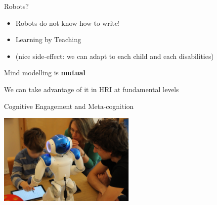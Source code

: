 \documentclass[handout,compress]{beamer}
\begin{document}
\begin{frame}{Robots?}
    \begin{itemize}
        \item<1-> Robots do not know how to write!
        \item<2-> Learning by Teaching
        \item<3-> (nice side-effect: we can adapt to each child and each disabilities)
    \end{itemize}
\end{frame}




\begin{frame}[plain]{}
    \centering
    Mind modelling is {\bf mutual}

    We can take advantage of it in HRI at fundamental levels

\end{frame}


{
\begin{frame}{Cognitive Engagement and Meta-cognition}

    \begin{flushright}
        \includegraphics[width=0.5\textwidth]{cowriter/henry}
    \end{flushright}

\end{frame}
}

\end{document}
